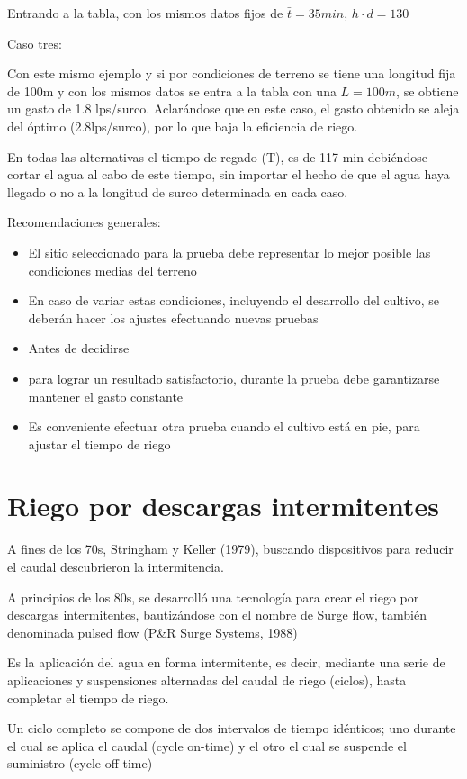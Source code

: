 Entrando a la tabla, con los mismos datos fijos de $\bar{t}= 35min$, $h\cdot d= 130$

Caso tres:

Con este mismo ejemplo y si por condiciones de terreno se tiene una longitud fija de 100m y con los mismos datos se entra a la tabla con una $L= 100m$, se obtiene un gasto de 1.8 lps/surco. Aclarándose que en este caso, el gasto obtenido se aleja del óptimo (2.8lps/surco), por lo que baja la eficiencia de riego.

En todas las alternativas el tiempo de regado (T), es de 117 min debiéndose cortar el agua al cabo de este tiempo, sin importar el hecho de que el agua haya llegado o no a la longitud de surco determinada en cada caso.

Recomendaciones generales:
\begin{itemize}
    \item El sitio seleccionado para la prueba debe representar lo mejor posible las condiciones medias del terreno
    \item En caso de variar estas condiciones, incluyendo el desarrollo del cultivo, se deberán hacer los ajustes efectuando nuevas pruebas
    \item Antes de decidirse
    \item para lograr un resultado satisfactorio, durante la prueba debe garantizarse mantener el gasto constante
    \item Es conveniente efectuar otra prueba cuando el cultivo está en pie, para ajustar el tiempo de riego
\end{itemize}

\section{Riego por descargas intermitentes}
A fines de los 70s, Stringham y Keller (1979), buscando dispositivos para reducir el caudal descubrieron la intermitencia.

A principios de los 80s, se desarrolló una tecnología para crear el riego por descargas intermitentes, bautizándose con el nombre de Surge flow, también denominada pulsed flow (P\&R Surge Systems, 1988)

Es la aplicación del agua en forma intermitente, es decir, mediante una serie de aplicaciones y suspensiones alternadas del caudal de riego (ciclos), hasta completar el tiempo de riego.

Un ciclo completo se compone de dos intervalos de tiempo idénticos; uno durante el cual se aplica el caudal (cycle on-time) y el otro el cual se suspende el suministro (cycle off-time)

